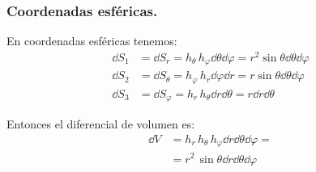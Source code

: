 \subsubsection{Coordenadas esféricas.}

En coordenadas esféricas tenemos:
\begin{align*}
\dd{S_{1}} &= \dd{S_{r}} = h_{\theta} \, h_{\varphi} \dd{\theta} \dd{\varphi} = r^{2} \sin \theta \dd{\theta} \dd{\varphi} \\[0.5em]
\dd{S_{2}} &= \dd{S_{\theta}} = h_{\varphi} \, h_{r} \dd{\varphi} \dd{r} = r \sin \theta \dd{\theta} \dd{\varphi} \\[0.5em]
\dd{S_{3}} &= \dd{S_{\varphi}} = h_{r} \, h_{\theta} \dd{r} \dd{\theta} = r \dd{r} \dd{\theta}
\end{align*}

Entonces el diferencial de volumen es:
\begin{align*}
\dd{V} &= h_{r} \, h_{\theta} \, h_{\varphi} \dd{r} \dd{\theta} \dd{\varphi} = \\[0.5em]
&= r^{2} \, \sin \theta \dd{r} \dd{\theta} \dd{\varphi}
\end{align*}



